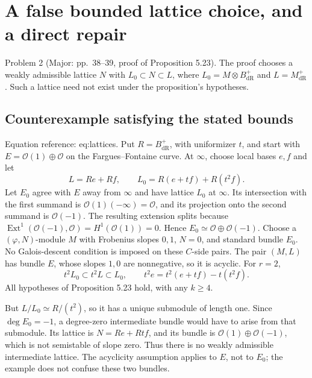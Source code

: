 \documentclass[10pt]{article}
\begin{document}
\section*{A false bounded lattice choice, and a direct repair}
Problem 2 (Major: pp. 38–39, proof of Proposition 5.23).  The proof chooses a weakly admissible lattice \(N\) with \(L_0\subset N\subset L\), where \(L_0=M\otimes B_{\mathrm{dR}}^+\) and \(L=M_{\mathrm{dR}}^+\). Such a lattice need not exist under the proposition’s hypotheses.\par
\subsection*{Counterexample satisfying the stated bounds}
Equation reference: eq:lattices. Put \(R=B_{\mathrm{dR}}^+\), with uniformizer \(t\), and start with \(E=\mathcal O(1)\oplus\mathcal O\) on the Fargues–Fontaine curve. At \(\infty\), choose local bases \(e,f\) and let \[
 L=Re+Rf,\qquad L_0=R(e+tf)+R(t^2f).\] Let \(E_0\) agree with \(E\) away from \(\infty\) and have lattice \(L_0\) at \(\infty\). Its intersection with the first summand is \(\mathcal O(1)(-\infty)=\mathcal O\), and its projection onto the second summand is \(\mathcal O(-1)\). The resulting extension splits because \(\operatorname{Ext}^1(\mathcal O(-1),\mathcal O)=H^1(\mathcal O(1))=0\). Hence \(E_0\simeq\mathcal O\oplus\mathcal O(-1)\). Choose a \((\varphi,N)\)-module \(M\) with Frobenius slopes \(0,1\), \(N=0\), and standard bundle \(E_0\). No Galois-descent condition is imposed on these \(C\)-side pairs. The pair \((M,L)\) has bundle \(E\), whose slopes \(1,0\) are nonnegative, so it is acyclic. For \(r=2\), \[t^2L_0\subset t^2L\subset L_0,
 \qquad t^2e=t^2(e+tf)-t(t^2f).\] All hypotheses of Proposition 5.23 hold, with any \(k\geq4\).\par
But \(L/L_0\simeq R/(t^2)\), so it has a unique submodule of length one. Since \(\deg E_0=-1\), a degree-zero intermediate bundle would have to arise from that submodule. Its lattice is \(N=Re+Rtf\), and its bundle is \(\mathcal O(1)\oplus\mathcal O(-1)\), which is not semistable of slope zero. Thus there is no weakly admissible intermediate lattice. The acyclicity assumption applies to \(E\), not to \(E_0\); the example does not confuse these two bundles.\par
\end{document}
